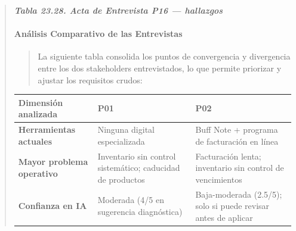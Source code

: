 \documentclass[
]{article}
\newcounter{none} %
\begin{document}
\begin{quote}
\protect{}\label{_bookmark_P16_hallazgos}{}\emph{\textbf{Tabla 23.28. Acta de Entrevista P16 --- hallazgos}}

\paragraph{Análisis Comparativo de las
Entrevistas}\label{anuxe1lisis-comparativo-de-las-entrevistas}

\begin{quote}
La siguiente tabla consolida los puntos de convergencia y divergencia
entre los dos stakeholders entrevistados, lo que permite priorizar y
ajustar los requisitos crudos:
\end{quote}

{\def\LTcaptype{none} %
\begin{longtable}[]{|
  >{\raggedright\arraybackslash}p{}|
  >{\raggedright\arraybackslash}p{}|
  >{\raggedright\arraybackslash}p{}|}
\hline
\begin{minipage}[b]{\linewidth}\raggedright
\textbf{Dimensión analizada}
\end{minipage} & \begin{minipage}[b]{\linewidth}\raggedright
\textbf{P01}
\end{minipage} & \begin{minipage}[b]{\linewidth}\raggedright
\textbf{P02}
\end{minipage} \\
\hline
\endhead
\hline
\endlastfoot
\textbf{Herramientas actuales} &
\begin{minipage}[t]{\linewidth}\raggedright
Ninguna digital especializada
\end{minipage} & \begin{minipage}[t]{\linewidth}\raggedright
Buff Note + programa de facturación en línea
\end{minipage} \\
\hline
\textbf{Mayor problema operativo} &
\begin{minipage}[t]{\linewidth}\raggedright
Inventario sin control sistemático; caducidad de productos
\end{minipage} & \begin{minipage}[t]{\linewidth}\raggedright
Facturación lenta; inventario sin control de vencimientos
\end{minipage} \\
\hline
\textbf{Confianza en IA} & \begin{minipage}[t]{\linewidth}\raggedright
Moderada (4/5 en sugerencia diagnóstica)
\end{minipage} & \begin{minipage}[t]{\linewidth}\raggedright
Baja-moderada (2.5/5); solo si puede revisar antes de aplicar
\end{minipage} \\
\hline
\end{longtable}
}


\end{quote}
\end{document}
